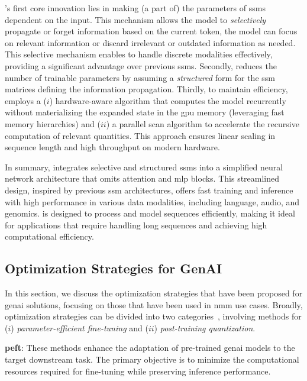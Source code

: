 's first core innovation lies in making (a part of) the parameters of \glspl{ssm} dependent on the input. This mechanism allows the model to \emph{selectively} propagate or forget information based on the current token, \ie the model can focus on relevant information or discard irrelevant or outdated information as needed.
This selective mechanism enables  to handle discrete modalities effectively, providing a significant advantage over previous \glspl{ssm}.
Secondly,  reduces the number of trainable parameters by assuming a \emph{structured} form for the \gls{ssm} matrices defining the information propagation.
Thirdly, to maintain efficiency,  employs a ($i$) hardware-aware algorithm that computes the model recurrently without materializing the expanded state in the \gls{gpu} memory (leveraging fast memory hierarchies) and ($ii$) a parallel scan algorithm to accelerate the recursive computation of relevant quantities. This approach ensures linear scaling in sequence length and high throughput on modern hardware.



In summary,  integrates selective and structured \glspl{ssm} into a simplified neural network architecture that omits attention and \gls{mlp} blocks. This streamlined design, inspired by previous \gls{ssm} architectures, offers fast training and inference with high performance in various data modalities, including language, audio, and genomics.
 is designed to process and model sequences efficiently, making it ideal for applications that require handling long sequences and achieving high computational efficiency.

\subsection{Optimization Strategies for GenAI}
\label{subsec:optimization}
In this section,
we discuss the optimization strategies that have been proposed for \gls{genai} solutions,
focusing on those that have been used in \gls{nmm} use cases.
Broadly, optimization strategies can be divided into two categories~\cite{kim2024memory}, involving methods for ($i$) \emph{parameter-efficient fine-tuning} and ($ii$) \emph{post-training quantization}.



\vspace{5pt}
\noindent
\textbf{\gls{peft}}:
These methods enhance the adaptation of pre-trained \gls{genai} models to the target downstream task.
The primary objective is to minimize the computational resources required for fine-tuning while preserving inference performance.

